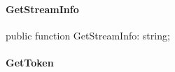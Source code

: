 \documentclass{report}
\newif\ifpdf
\begin{document}
\paragraph*{GetStreamInfo}\hspace*{\fill}

\label{PasDoc_Tokenizer.TTokenizer-GetStreamInfo}
\begin{list}{}{
\setlength{\itemindent}{0cm}
\setlength{\listparindent}{0cm}
\setlength{\leftmargin}{\evensidemargin}
\addtolength{\leftmargin}{\tmplength}
\settowidth{\labelsep}{X}
\addtolength{\leftmargin}{\labelsep}
\setlength{\labelwidth}{\tmplength}
}
\item[\textbf{Declaration}\hfill]
\ifpdf
\begin{flushleft}
\fi
\begin{ttfamily}
public function GetStreamInfo: string;\end{ttfamily}

\ifpdf
\end{flushleft}
\fi

\end{list}
\paragraph*{GetToken}\hspace*{\fill}
\end{document}
